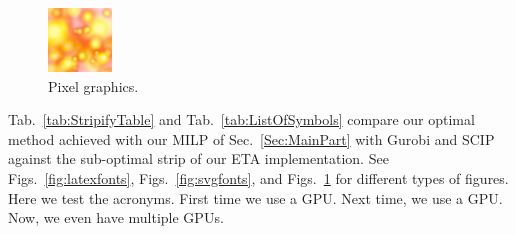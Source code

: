\begin{figure}
    \centering
    \includegraphics[width=\columnwidth]{imgs/img.png}
    \caption{Pixel graphics.}\label{fig:pixel}
\end{figure}

Tab.~\ref{tab:StripifyTable} and Tab.~\ref{tab:ListOfSymbols} compare our optimal 
method achieved with our 
\ac{MILP} 
of Sec.~\ref{Sec:MainPart} with Gurobi and SCIP against the sub-optimal strip of our 
\ac{ETA} 
implementation.
See Figs.~\ref{fig:latexfonts}, Figs.~\ref{fig:svgfonts}, and Figs.~\ref{fig:pixel} for different types of figures.
Here we test the acronyms.
First time we use a \ac{GPU}.
Next time, we use a \ac{GPU}.
Now, we even have multiple \acp{GPU}.
